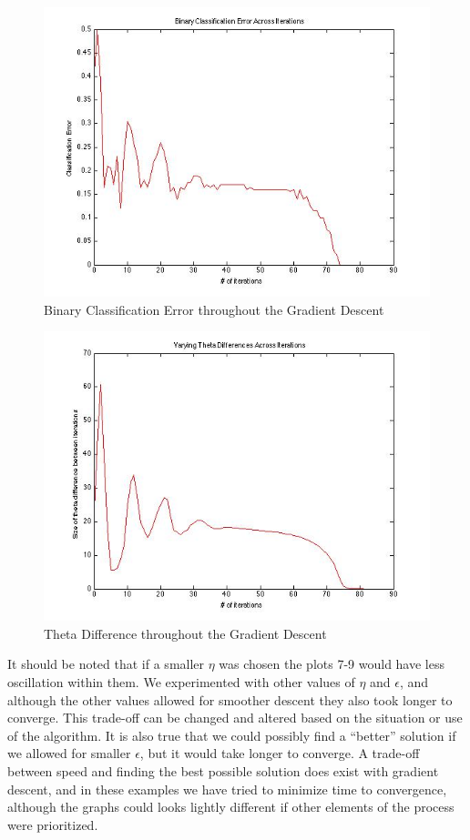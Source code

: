\documentclass[paper=a4, fontsize=11pt]{scrartcl} %
\begin{document}
\begin{figure}
\centering
\includegraphics[scale=0.4]{BinClassErr.jpg}
\caption{Binary Classification Error throughout the Gradient Descent}
\label{fig:BinErr}
\end{figure}

\begin{figure}
\centering
\includegraphics[scale=0.4]{theta_diff.jpg}
\caption{Theta Difference throughout the Gradient Descent}
\label{fig:thetadiff}
\end{figure}

It should be noted that if a smaller $\eta$ was chosen the plots 7-9 would have less oscillation within them.
We experimented with other values of $\eta$ and $\epsilon$, and although the other values allowed for smoother descent they also took longer to converge.
This trade-off can be changed and altered based on the situation or use of the algorithm.
It is also true that we could possibly find a ``better'' solution if we allowed for smaller $\epsilon$, but it would take longer to converge.
A trade-off between speed and finding the best possible solution does exist with gradient descent, and in these examples we have tried to minimize time to convergence, although the graphs could looks lightly different if other elements of the process were prioritized.
\end{document}
